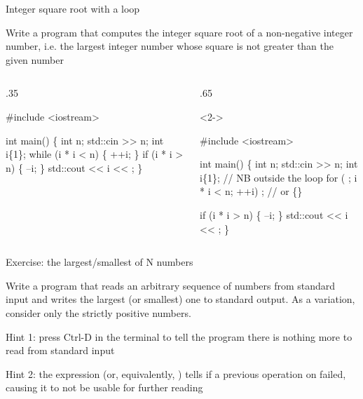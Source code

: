 \begin{frame}[fragile]{Integer square root with a  loop}

  Write a program that computes the integer square root of a non-negative
  integer number, i.e. the largest integer number whose square is not greater
  than the given number

  \begin{columns}[T]
    \begin{column}{.35\textwidth}
      \begin{codeblock}
#include <iostream>

int main()
\{
  int n;
  std::cin >> n;
  int i\{1\};
  while (i * i < n) \{
    ++i;
  \}
  if (i * i > n) \{
    --i;
  \}
  std::cout <{}< i <{}< \bslashn;
\}\end{codeblock}
    \end{column}

    \begin{column}{.65\textwidth}
      \begin{codeblock}<2->{
#include <iostream>

int main()
\{
  int n;
  std::cin >> n;
  int i\{1\};  // NB outside the loop
  for ( ; i * i < n; ++i) ;  // or \{\}


  if (i * i > n) \{
    --i;
  \}
  std::cout << i << \bslashn;
\}}\end{codeblock}
    \end{column}

  \end{columns}

\end{frame}

\begin{frame}{Exercise: the largest/smallest of N numbers}

  Write a program that reads an arbitrary sequence of numbers from standard
  input and writes the largest (or smallest) one to standard output. As a
  variation, consider only the strictly positive numbers.

  Hint 1: press Ctrl-D in the terminal to tell the program there is nothing more
  to read from standard input

  Hint 2: the expression  (or, equivalently,
  ) tells if a previous operation on  failed,
  causing it to not be usable for further reading

\end{frame}

